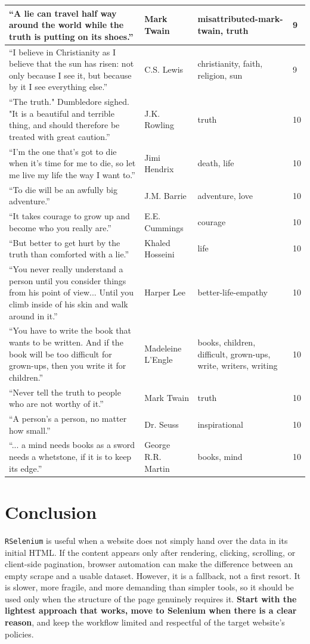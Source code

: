 \documentclass[
  letterpaper,
  DIV=11,
  numbers=noendperiod]{scrreprt}
\begin{document}
\begin{tabular}[t]{l|l|l|l}
\hline
“A lie can travel half way around the world while the truth is putting on its shoes.” & Mark Twain & misattributed-mark-twain, truth & 9\\
\hline
“I believe in Christianity as I believe that the sun has risen: not only because I see it, but because by it I see everything else.” & C.S. Lewis & christianity, faith, religion, sun & 9\\
\hline
“The truth." Dumbledore sighed. "It is a beautiful and terrible thing, and should therefore be treated with great caution.” & J.K. Rowling & truth & 10\\
\hline
“I'm the one that's got to die when it's time for me to die, so let me live my life the way I want to.” & Jimi Hendrix & death, life & 10\\
\hline
“To die will be an awfully big adventure.” & J.M. Barrie & adventure, love & 10\\
\hline
“It takes courage to grow up and become who you really are.” & E.E. Cummings & courage & 10\\
\hline
“But better to get hurt by the truth than comforted with a lie.” & Khaled Hosseini & life & 10\\
\hline
“You never really understand a person until you consider things from his point of view... Until you climb inside of his skin and walk around in it.” & Harper Lee & better-life-empathy & 10\\
\hline
“You have to write the book that wants to be written. And if the book will be too difficult for grown-ups, then you write it for children.” & Madeleine L'Engle & books, children, difficult, grown-ups, write, writers, writing & 10\\
\hline
“Never tell the truth to people who are not worthy of it.” & Mark Twain & truth & 10\\
\hline
“A person's a person, no matter how small.” & Dr. Seuss & inspirational & 10\\
\hline
“... a mind needs books as a sword needs a whetstone, if it is to keep its edge.” & George R.R. Martin & books, mind & 10\\
\hline
\end{tabular}

\section{Conclusion}\label{conclusion}

\texttt{RSelenium} is useful when a website does not simply hand over
the data in its initial HTML. If the content appears only after
rendering, clicking, scrolling, or client-side pagination, browser
automation can make the difference between an empty scrape and a usable
dataset. However, it is a fallback, not a first resort. It is slower,
more fragile, and more demanding than simpler tools, so it should be
used only when the structure of the page genuinely requires it.
\textbf{Start with the lightest approach that works, move to Selenium
when there is a clear reason}, and keep the workflow limited and
respectful of the target website's policies.
\end{document}
